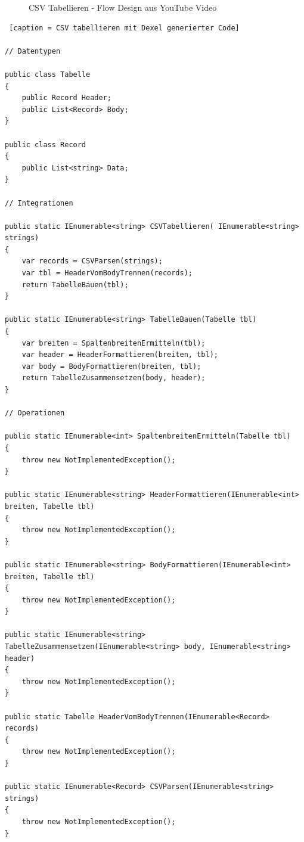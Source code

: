 \begin{figure}[H]
	\caption{CSV Tabellieren - Flow Design aus YouTube Video}
\end{figure}






\begin{lstlisting} [caption = CSV tabellieren mit Dexel generierter Code]

// Datentypen

public class Tabelle
{
    public Record Header;
    public List<Record> Body;
}

public class Record
{
    public List<string> Data;
}

// Integrationen

public static IEnumerable<string> CSVTabellieren( IEnumerable<string> strings)
{
	var records = CSVParsen(strings);
	var tbl = HeaderVomBodyTrennen(records);
	return TabelleBauen(tbl);
}

public static IEnumerable<string> TabelleBauen(Tabelle tbl)
{
	var breiten = SpaltenbreitenErmitteln(tbl);
	var header = HeaderFormattieren(breiten, tbl);
	var body = BodyFormattieren(breiten, tbl);
	return TabelleZusammensetzen(body, header);
}

// Operationen

public static IEnumerable<int> SpaltenbreitenErmitteln(Tabelle tbl)
{
    throw new NotImplementedException();
}

public static IEnumerable<string> HeaderFormattieren(IEnumerable<int> breiten, Tabelle tbl)
{
    throw new NotImplementedException();
}

public static IEnumerable<string> BodyFormattieren(IEnumerable<int> breiten, Tabelle tbl)
{
    throw new NotImplementedException();
}

public static IEnumerable<string> TabelleZusammensetzen(IEnumerable<string> body, IEnumerable<string> header)
{
    throw new NotImplementedException();
}

public static Tabelle HeaderVomBodyTrennen(IEnumerable<Record> records)
{
    throw new NotImplementedException();
}

public static IEnumerable<Record> CSVParsen(IEnumerable<string> strings)
{
    throw new NotImplementedException();
}


\end{lstlisting}

